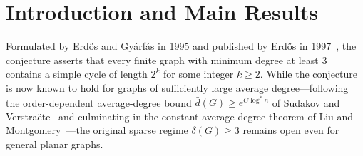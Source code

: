 \documentclass[11pt,reqno]{amsart}
\theoremstyle{plain}
\theoremstyle{definition}
\theoremstyle{remark}
\newcommand{\EG}{\text{Erd\H{o}s--Gy\'arf\'as}}
\DeclareRobustCommand{\_}{\ifmmode\text{\textunderscore}\else\textunderscore\allowbreak\fi}
\begin{document}
\begin{abstract}
\begin{enumerate}[label=(\arabic*),leftmargin=2.2em]
\end{enumerate}
Our verification artifact separates four transparent layers: (i)~core discrete algebraic, discharging, Bellman--Ford/DP soundness, and density lemmas proved in the pure Lean~4 kernel (\texttt{v4.36.0}, zero \texttt{sorry}, zero custom axioms, zero \texttt{native\_decide}); (ii)~proof-carrying Lean~4 certificates for packed dual potentials, DP/BWD upper bounds, $6{,}772$ strict-schema explicit simple dyadic-cycle patch entries (counted with multiplicity across certificate groups), and cellular-rotation sharpness witnesses; (iii)~standalone zero-float standard-library Python replay (\texttt{cert/verify\_planar\_eg.py}) of all underlying finite searches and uncollapsed DPs, paired with a runnable zero-float parity and weighted state-collapse verifier (\texttt{cert/verify\_parity\_and\_dp.py}) checking all $12$ weighted DP simulations and literal Lean--Python--JSON parity; and (iv)~full topological and graph-theoretic proofs in this manuscript.
\end{abstract}

\maketitle

\tableofcontents

\section{Introduction and Main Results}\label{sec:intro}

Formulated by Erd\H{o}s and Gy\'arf\'as in 1995 and published by Erd\H{o}s in 1997~\cite{Erdos1997}, the \EG{} conjecture asserts that every finite graph with minimum degree at least $3$ contains a simple cycle of length $2^k$ for some integer $k \ge 2$. While the conjecture is now known to hold for graphs of sufficiently large average degree---following the order-dependent average-degree bound $\bar{d}(G) \ge e^{C \log^* n}$ of Sudakov and Verstra\"ete~\cite{SudakovVerstraete2008} and culminating in the constant average-degree theorem of Liu and Montgomery~\cite{LiuMontgomery2023}---the original sparse regime $\delta(G) \ge 3$ remains open even for general planar graphs.
\end{document}
